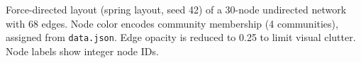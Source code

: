 \caption{Force-directed layout (spring layout, seed 42) of a 30-node undirected network with 68 edges. Node color encodes community membership (4 communities), assigned from \texttt{data.json}. Edge opacity is reduced to 0.25 to limit visual clutter. Node labels show integer node IDs.}
